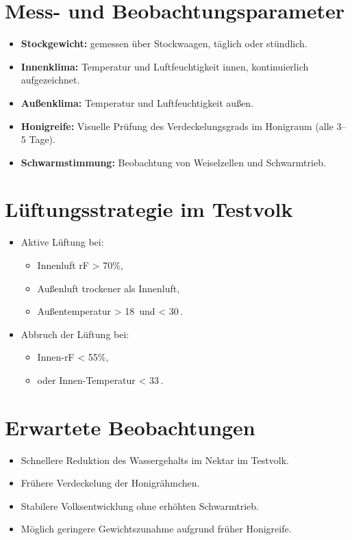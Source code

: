 \documentclass[11pt,a4paper]{article}
\begin{document}
\section*{Mess- und Beobachtungsparameter}
\begin{itemize}[topsep=2pt]
  \item \textbf{Stockgewicht:} gemessen \"uber Stockwaagen, t\"aglich oder st\"undlich.
  \item \textbf{Innenklima:} Temperatur und Luftfeuchtigkeit innen, kontinuierlich aufgezeichnet.
  \item \textbf{Au\ss{}enklima:} Temperatur und Luftfeuchtigkeit au\ss{}en.
  \item \textbf{Honigreife:} Visuelle Pr\"ufung des Verdeckelungsgrads im Honigraum (alle 3--5 Tage).
  \item \textbf{Schwarmstimmung:} Beobachtung von Weiselzellen und Schwarmtrieb.
\end{itemize}

\section*{L\"uftungsstrategie im Testvolk}
\begin{itemize}[topsep=2pt]
  \item Aktive L\"uftung bei:
  \begin{itemize}[topsep=1pt]
    \item Innenluft rF > 70\%,
    \item Au\ss{}enluft trockener als Innenluft,
    \item Au\ss{}entemperatur > 18\,\textcelsius{} und < 30\,\textcelsius{}.
  \end{itemize}
  \item Abbruch der L\"uftung bei:
  \begin{itemize}[topsep=1pt]
    \item Innen-rF < 55\%,
    \item oder Innen-Temperatur < 33\,\textcelsius{}.
  \end{itemize}
\end{itemize}

\section*{Erwartete Beobachtungen}
\begin{itemize}[topsep=2pt]
  \item Schnellere Reduktion des Wassergehalts im Nektar im Testvolk.
  \item Fr\"uhere Verdeckelung der Honigr\"ahmchen.
  \item Stabilere Volksentwicklung ohne erh\"ohten Schwarmtrieb.
  \item M\"oglich geringere Gewichtszunahme aufgrund fr\"uher Honigreife.
\end{itemize}
\end{document}
